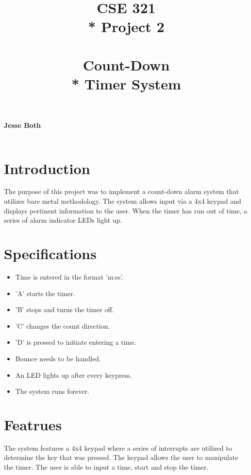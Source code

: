 \documentclass{article}
\title{\Huge{\textbf{CSE 321}  \\* Project 2 \\~\\ \textbf{Count-Down \\* Timer System}}}
\date{} %
\begin{document}
    \maketitle
    \vfill 
    {\Large\centering\textbf{Jesse Both  \\~\\}\par}

    {\Large{}\par}
    {\large\centering{\today}\par}

    \newpage
    \begin{center}
        \tableofcontents
    \end{center}
\newpage
\setcounter{secnumdepth}{-1}


\section{Introduction}
The purpose of this project was to implement a count-down alarm system that utilizes bare metal methodology.
The system allows input via a 4x4 keypad and displays pertinent information to the user.  When the timer has 
run out of time, a series of alarm indicator LEDs light up.
\newline

\section{Specifications}

\begin{itemize}
    \item Time is entered in the format 'm:ss'.
    \item 'A' starts the timer.
    \item 'B' stops and turns the timer off.
    \item 'C' changes the count direction.
    \item 'D' is pressed to initiate entering a time.
    \item Bounce needs to be handled.
    \item An LED lights up after every keypress.
    \item The system runs forever.
  \end{itemize}

\section{Featrues}
The system features a 4x4 keypad where a series of interrupts are utilized to determine the key that was
pressed.  The keypad allows the user to manipulate the timer.  The user is able to input a time, start and 
stop the timer.
\newline
\end{document}
